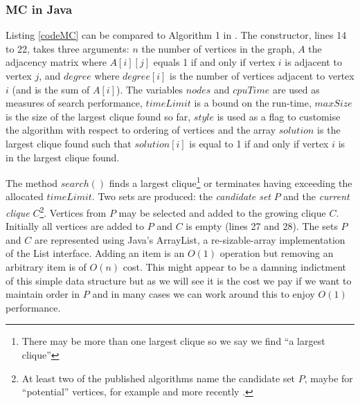 \documentclass{l4proj}
\begin{document}
\subsubsection{MC in Java}
Listing \ref{codeMC} can be compared to Algorithm 1 in \cite{fahle}.
The constructor, lines 14 to 22, takes three arguments: $n$ the number of vertices in the graph, $A$ the adjacency 
matrix where $A[i][j]$ equals 1 if and only if vertex $i$ is adjacent to vertex $j$, and $degree$ where $degree[i]$ is
the number of vertices adjacent to vertex $i$ (and is the sum of $A[i]$). The variables $nodes$ and $cpuTime$ are used
as measures of search performance, $timeLimit$ is a bound on the run-time, $maxSize$ is the size of the largest clique found so far,
$style$ is used as a flag to customise the algorithm with respect to ordering of vertices and the array $solution$ is the largest clique found
such that $solution[i]$ is equal to 1 if and only if vertex $i$ is in the largest clique found.

The method $search()$ finds a largest clique\footnote{There may be more than one largest clique so we say we find ``a largest
clique''} or terminates having exceeding the allocated $timeLimit$. Two sets are produced: the \emph{candidate set} $P$
and the \emph{current clique} $C$\footnote{At least two of the published algorithms name the candidate set $P$, maybe 
for ``potential'' vertices, for example \cite{fahle} and more recently \cite{eppstein2011}.}.  
Vertices from $P$ may be selected and added to the growing clique $C$. Initially all 
vertices are added to $P$ and $C$ is empty (lines 27 and 28).
The sets $P$ and $C$ are represented using Java's ArrayList, a re-sizable-array implementation of the List interface. Adding
an item is an $O(1)$ operation but removing an arbitrary item is of $O(n)$ cost. This might appear to be a damning 
indictment of this simple data structure but as we will see it is the cost we pay if we want to maintain order in $P$ and
in many cases we can work around this to enjoy $O(1)$ performance.
\end{document}
